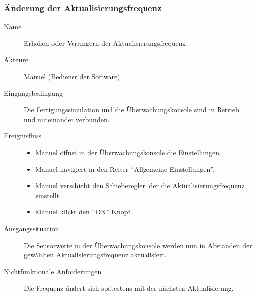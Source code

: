 \documentclass[parskip=full]{scrartcl}
\begin{document}
\subsubsection{Änderung der Aktualisierungsfrequenz}
\begin{description}
 \item[Name] Erhöhen oder Verringern der Aktualisierungsfrequenz.
 \item[Akteure] Manuel (Bediener der Software)
 \item[Eingangsbedingung] Die Fertigungssimulation und die Überwachungskonsole sind in Betrieb und miteinander verbunden.
 \item[Ereignisfluss]
 \begin{itemize}[noitemsep]
  \item Manuel öffnet in der Überwachungskonsole die Einstellungen.
  \item Manuel navigiert in den Reiter ``Allgemeine Einstellungen''.
  \item Manuel verschiebt den Schieberegler, der die Aktualisierungsfrequenz einstellt.
  \item Manuel klickt den ``OK'' Knopf.
 \end{itemize}
 \item[Ausgangssituation] Die Sensorwerte in der Überwachungskonsole werden nun in Abständen der gewählten Aktualisierungsfrequenz aktualisiert.
 \item [Nichtfunktionale Anforderungen] Die Frequenz ändert sich spätestens mit der nächsten Aktualisierung.
\end{description}
\end{document}
